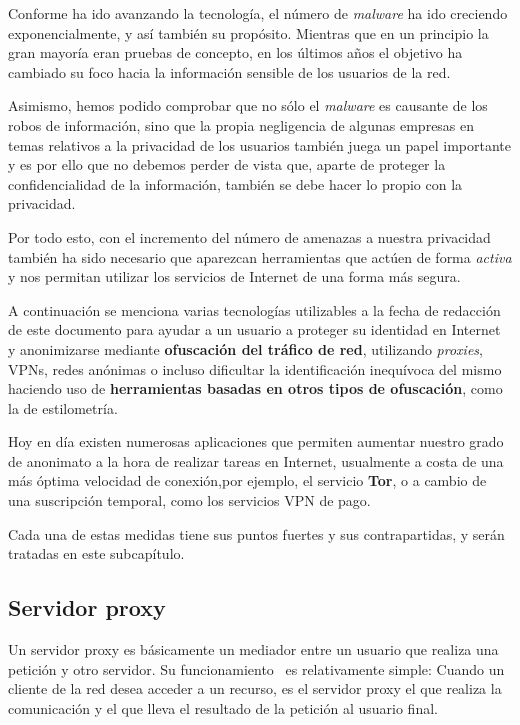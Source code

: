 Conforme ha ido avanzando la tecnología, el número de \textit{malware} ha ido creciendo exponencialmente, y así también su propósito. Mientras que en un principio la gran mayoría eran pruebas de concepto, en los últimos años el objetivo ha cambiado su foco hacia la información sensible de los usuarios de la red. 

Asimismo, hemos podido comprobar que no sólo el \textit{malware} es causante de los robos de información, sino que la propia negligencia de algunas empresas en temas relativos a la privacidad de los usuarios también juega un papel importante y es por ello que no debemos perder de vista que, aparte de proteger la confidencialidad de la información, también se debe hacer lo propio con la privacidad.

Por todo esto, con el incremento del número de amenazas a nuestra privacidad también ha sido necesario que aparezcan herramientas que actúen de forma \textit{activa} y nos permitan utilizar los servicios de Internet de una forma más segura.
	
\label{sec:a_favor}

A continuación se menciona varias tecnologías utilizables a la fecha de redacción de este documento para ayudar a un usuario a proteger su identidad en Internet y anonimizarse mediante \textbf{ofuscación del tráfico de red}, utilizando \textit{proxies}, VPNs, redes anónimas o incluso dificultar la identificación inequívoca del mismo haciendo uso de \textbf{herramientas basadas en otros tipos de ofuscación}, como la de estilometría.

Hoy en día existen numerosas aplicaciones que permiten aumentar nuestro grado de anonimato a la hora de realizar tareas en Internet, usualmente a costa de una más óptima velocidad de conexión,por ejemplo, el servicio \textbf{Tor}, o a cambio de una suscripción temporal, como los servicios VPN de pago.

Cada una de estas medidas tiene sus puntos fuertes y sus contrapartidas, y serán tratadas en este subcapítulo.

\subsection{Servidor proxy}

Un servidor proxy es básicamente un mediador entre un usuario que realiza una petición y otro servidor.
Su funcionamiento~\cite{article:proxy} es relativamente simple: Cuando un cliente de la red desea acceder a un recurso, es el servidor proxy el que realiza la comunicación y el que lleva el resultado de la petición al usuario final. 

